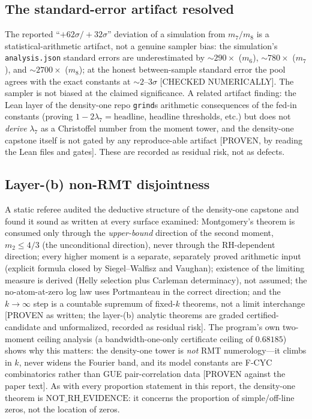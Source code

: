 \documentclass[11pt]{article}
\begin{document}
\subsection{The standard-error artifact resolved}
The reported ``$+62\sigma/+32\sigma$'' deviation of a simulation from $m_7/m_8$
is a statistical-arithmetic artifact, not a genuine sampler bias: the
simulation's \texttt{analysis.json} standard errors are underestimated by
$\sim 290\times$ ($m_6$), $\sim 780\times$ ($m_7$), and $\sim 2700\times$
($m_8$); at the honest between-sample standard error the pool agrees with the
exact constants at $\sim 2$--$3\sigma$ [CHECKED NUMERICALLY]. The sampler is
not biased at the claimed significance. A related artifact finding: the Lean
layer of the density-one repo \texttt{grind}s arithmetic consequences of the
fed-in constants (proving $1-2\lambda_7 = \text{headline}$, headline thresholds,
etc.) but does not \emph{derive} $\lambda_7$ as a Christoffel number from the
moment tower, and the density-one capstone itself is not gated by any
reproduce-able artifact [PROVEN, by reading the Lean files and gates]. These
are recorded as residual risk, not as defects.

\subsection{Layer-(b) non-RMT disjointness}
A static referee audited the deductive structure of the density-one capstone
and found it sound as written at every surface examined: Montgomery's theorem
is consumed only through the \emph{upper-bound} direction of the second moment,
$m_2 \le 4/3$ (the unconditional direction), never through the
RH-dependent direction; every higher moment is a separate, separately proved
arithmetic input (explicit formula closed by Siegel--Walfisz and Vaughan);
existence of the limiting measure is derived (Helly selection plus Carleman
determinacy), not assumed; the no-atom-at-zero log law uses Portmanteau in the
correct direction; and the $k\to\infty$ step is a countable supremum of
fixed-$k$ theorems, not a limit interchange [PROVEN as written; the layer-(b)
analytic theorems are graded certified-candidate and unformalized, recorded as
residual risk]. The program's own two-moment ceiling analysis (a
bandwidth-one-only certificate ceiling of $0.68185$) shows why this matters:
the density-one tower is \emph{not} RMT numerology---it climbs in $k$, never
widens the Fourier band, and its model constants are F-CYC combinatorics rather
than GUE pair-correlation data [PROVEN against the paper text]. As with every
proportion statement in this report, the density-one theorem is
$\mathrm{NOT\_RH\_EVIDENCE}$: it concerns the proportion of simple/off-line
zeros, not the location of zeros.
\end{document}

